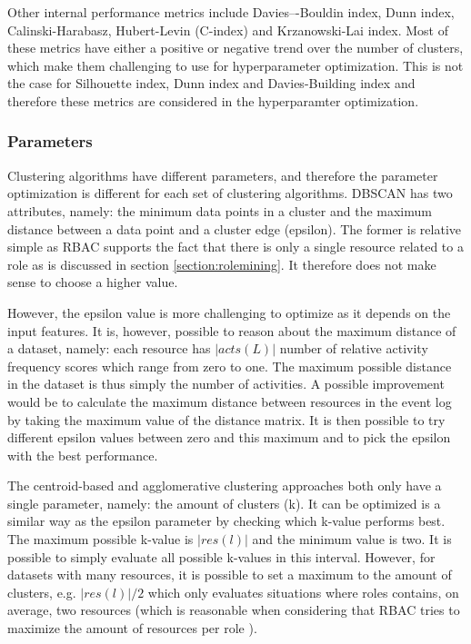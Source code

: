 Other internal performance metrics include Davies–-Bouldin index, Dunn index, Calinski-Harabasz, Hubert-Levin (C-index) and Krzanowski-Lai index. Most of these metrics have either a positive or negative trend over the number of clusters, which make them challenging to use for hyperparameter optimization. This is not the case for Silhouette index, Dunn index and Davies-Building index and therefore these metrics are considered in the hyperparamter optimization. 


\subsubsection{Parameters}
Clustering algorithms have different parameters, and therefore the parameter optimization is different for each set of clustering algorithms. DBSCAN has two attributes, namely: the minimum data points in a cluster and the maximum distance between a data point and a cluster edge (epsilon). The former is relative simple as RBAC supports the fact that there is only a single resource related to a role as is discussed in section \ref{section:rolemining}. It therefore does not make sense to choose a higher value. 

However, the epsilon value is more challenging to optimize as it depends on the input features. It is, however, possible to reason about the maximum distance of a dataset, namely: each resource has $|acts(L)|$ number of relative activity frequency scores which range from zero to one. The maximum possible distance in the dataset is thus simply the number of activities. A possible improvement would be to calculate the maximum distance between resources in the event log by taking the maximum value of the distance matrix. It is then possible to try different epsilon values between zero and this maximum and to pick the epsilon with the best performance. 

The centroid-based and agglomerative clustering approaches both only have a single parameter, namely: the amount of clusters (k). It can be optimized is a similar way as the epsilon parameter by checking which k-value performs best. The maximum possible k-value is $|res(l)|$ and the minimum value is two. It is possible to simply evaluate all possible k-values in this interval. However, for datasets with many resources, it is possible to set a maximum to the amount of clusters, e.g.  $|res(l)| / 2$ which only evaluates situations where roles contains, on average, two resources (which is reasonable when considering that RBAC tries to maximize the amount of resources per role \cite{rbac2}).  

